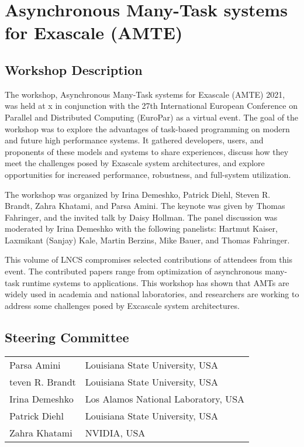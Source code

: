 \documentclass{llncs}
\begin{document}

\section*{Asynchronous Many-Task systems for Exascale (AMTE)}

\subsection*{Workshop Description}
The workshop, Asynchronous Many-Task systems for Exascale (AMTE) 2021, was held at x in conjunction with the 27th International European Conference on Parallel and Distributed Computing (EuroPar) as a virtual event. The goal of the workshop was to explore the advantages of task-based programming on modern and future high performance systems. It gathered developers, users, and proponents of these models and systems to share experiences, discuss how they meet the challenges posed by Exascale system architectures, and explore opportunities for increased performance, robustness, and full-system utilization.

The workshop was organized by Irina Demeshko, Patrick Diehl, Steven R. Brandt, Zahra Khatami, and Parsa Amini. The keynote was given by Thomas Fahringer, and the invited talk by Daisy Hollman. The panel discussion was moderated by Irina Demeshko with the following panelists: Hartmut Kaiser, Laxmikant (Sanjay) Kale, Martin Berzins, Mike Bauer, and Thomas Fahringer.

This volume of LNCS compromises selected contributions of attendees from this event. The contributed papers range from optimization of asynchronous many-task runtime systems to applications. This workshop has shown that AMTs are widely used in academia and national laboratories, and researchers are working to address some challenges posed by Excascale system architectures.


\subsection*{Steering Committee}
\begin{tabular}{@{}p{5cm}@{}p{7.2cm}@{}}
Parsa Amini & Louisiana State University, USA\\
teven R. Brandt & Louisiana State University, USA\\
Irina Demeshko & Los Alamos National Laboratory, USA\\
Patrick Diehl & Louisiana State University, USA\\
Zahra Khatami & NVIDIA, USA\\
\end{tabular}
\end{document}
